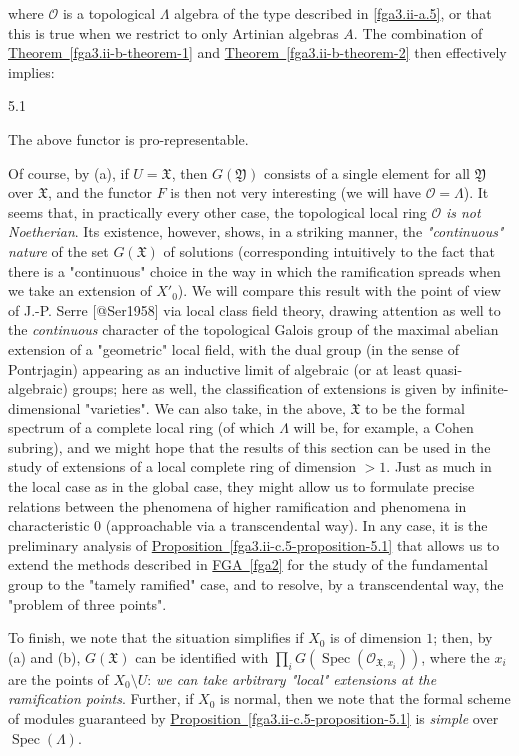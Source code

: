   where \(\mathscr {O}\) is a topological \(\Lambda \) algebra of the type described in \cref{fga3.ii-a.5}, or that this is true when we restrict to only Artinian algebras \(A\).
  The combination of \hyperref[fga3.ii-b-theorem-1]{Theorem~\ref*{fga3.ii-b-theorem-1}} and \hyperref[fga3.ii-b-theorem-2]{Theorem~\ref*{fga3.ii-b-theorem-2}} then effectively implies:\begin{proposition}{5.1}\label{fga3.ii-c.5-proposition-5.1}\skipsinglepar\par{}The above functor is pro-representable.\end{proposition}\par{}Of course, by (a), if \(U=\mathfrak {X}\), then \(G(\mathfrak {Y})\) consists of a single element for all \(\mathfrak {Y}\) over \(\mathfrak {X}\), and the functor \(F\) is then not very interesting (we will have \(\mathscr {O}=\Lambda \)).
  It seems that, in practically every other case, the topological local ring \(\mathscr {O}\) \emph{is not Noetherian}.
  Its existence, however, shows, in a striking manner, the \emph{"continuous" nature} of the set \(G(\mathfrak {X})\) of solutions (corresponding intuitively to the fact that there is a "continuous" choice in the way in which the ramification spreads when we take an extension of \(X'_0\)).
  We will compare this result with the point of view of J.-P. Serre [@Ser1958] via local class field theory, drawing attention as well to the \emph{continuous} character of the topological Galois group of the maximal abelian extension of a "geometric" local field, with the dual group (in the sense of Pontrjagin) appearing as an inductive limit of algebraic (or at least quasi-algebraic) groups;
  here as well, the classification of extensions is given by infinite-dimensional "varieties".
  We can also take, in the above, \(\mathfrak {X}\) to be the formal spectrum of a complete local ring (of which \(\Lambda \) will be, for example, a Cohen subring), and we might hope that the results of this section can be used in the study of extensions of a local complete ring of dimension \(>1\).
  Just as much in the local case as in the global case, they might allow us to formulate precise relations between the phenomena of higher ramification and phenomena in characteristic \(0\) (approachable via a transcendental way).
  In any case, it is the preliminary analysis of \hyperref[fga3.ii-c.5-proposition-5.1]{Proposition~\ref*{fga3.ii-c.5-proposition-5.1}} that allows us to extend the methods described in \hyperref[fga2]{FGA~\ref*{fga2}} for the study of the fundamental group to the "tamely ramified" case, and to resolve, by a transcendental way, the "problem of three points".\par{}To finish, we note that the situation simplifies if \(X_0\) is of dimension \(1\);
  then, by (a) and (b), \(G(\mathfrak {X})\) can be identified with \(\prod _i G(\operatorname {Spec}(\mathscr {O}_{\mathfrak {X},x_i}))\), where the \(x_i\) are the points of \(X_0\setminus  U\):
  \emph{we can take arbitrary "local" extensions at the ramification points}.
  Further, if \(X_0\) is normal, then we note that the formal scheme of modules guaranteed by \hyperref[fga3.ii-c.5-proposition-5.1]{Proposition~\ref*{fga3.ii-c.5-proposition-5.1}} is \emph{simple} over \(\operatorname {Spec}(\Lambda )\).